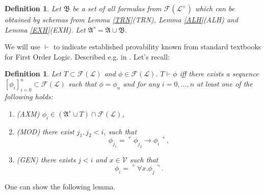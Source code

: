 \documentclass[10pt]{article}
\theoremstyle{plain}
\newtheorem{definition}[theorem]{Definition}
\newcommand{\F}{\mathcal{F}}
\renewcommand{\L}{\mathscr{L}}
\newcommand{\V}{\mathscr{V}}
\newcommand{\prove}{\vdash}
\begin{document}
\begin{definition}
\label{provability}
Let $\mathfrak{B}$ be a set of all formulas from $\F(\L^+)$ which can be obtained by schemas from Lemma \ref{TRN}(TRN), Lemma \ref{ALH}(ALH) and Lemma \ref{EXH}(EXH). Let $\mathfrak{A}^s = \mathfrak{A} \cup \mathfrak{B}$.
\end{definition}

We will use $\vdash$ to indicate established provability known from standard textbooks for First Order Logic. Described e.g. in \cite{prestel2011}.
Let's recall:
\begin{definition}
\label{classical-proof}
Let $T\subset \F(\L)$ and $\phi\in\F(\L)$.
$T\prove \phi$ iff
there exists a sequence 
$[\phi_i]_{i=0}^n \subset \F(\L)$ such that $\phi = \phi_n$ and for any $i=0, \dots, n$ at least one of the following holds:
\begin{enumerate}
\item (AXM) $\phi_i \in (\mathfrak{A}^s \cup T) \cap\F(\L)$,
\item (MOD) there exist $j_1, j_2 < i$, such that
\begin{equation}
\phi_{j_1} = \ulcorner \phi_{j_2} \to \phi_i \urcorner,
\end{equation}
\item (GEN) there exists $j < i$ and $x\in \V$ such that
\begin{equation}
\phi_i = \ulcorner \forall x. \phi_j \urcorner.
\end{equation}
\end{enumerate}

\end{definition} 

One can show the following lemma.
\end{document}
